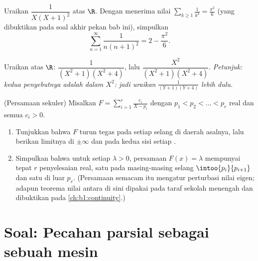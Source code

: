 \begin{exercise}[$\star\star$]\label{exo:b1:fractions:10}
Uraikan $\dfrac{1}{X(X+1)^2}$ atas $\R$. Dengan menerima nilai
$\sum_{k \geq 1} \frac1{k^2} = \frac{\pi^2}6$ (yang dibuktikan pada soal akhir
pekan bab ini), simpulkan
\[
\sum_{n=1}^{\infty} \frac{1}{n(n+1)^2} = 2 - \frac{\pi^2}{6} .
\]
\end{exercise}

\begin{exercise}[$\star\star$]\label{exo:b1:fractions:11}
Uraikan atas $\R$: $\dfrac{1}{(X^2+1)(X^2+4)}$, lalu
$\dfrac{X^2}{(X^2+1)(X^2+4)}$. \emph{Petunjuk: kedua penyebutnya adalah
 dalam $X^2$: jadi uraikan $\frac1{(Y+1)(Y+4)}$ lebih dulu.}
\end{exercise}

\begin{exercise}[$\star\star\star$]\label{exo:b1:fractions:12}
(Persamaan sekuler) Misalkan $F = \sum_{i=1}^{r} \frac{c_i}{X - p_i}$
dengan $p_1 < p_2 < \dots < p_r$ real dan semua $c_i > 0$.
\begin{enumerate}
  \item Tunjukkan bahwa $F$ turun tegas pada setiap selang di
        daerah asalnya, lalu berikan limitnya di $\pm\infty$ dan pada kedua
        sisi setiap .
  \item Simpulkan bahwa untuk setiap $\lambda > 0$, persamaan $F(x) =
        \lambda$ mempunyai tepat $r$ penyelesaian real, satu pada masing-masing
        selang $\intoo{p_i}{p_{i+1}}$ dan satu di luar $p_r$.
        (Persamaan semacam itu mengatur perturbasi nilai eigen; adapun
        teorema nilai antara di sini dipakai pada taraf sekolah menengah
        dan dibuktikan pada \cref{ch:b1:continuity}.)
\end{enumerate}
\end{exercise}

\section{Soal: Pecahan parsial sebagai sebuah mesin}


